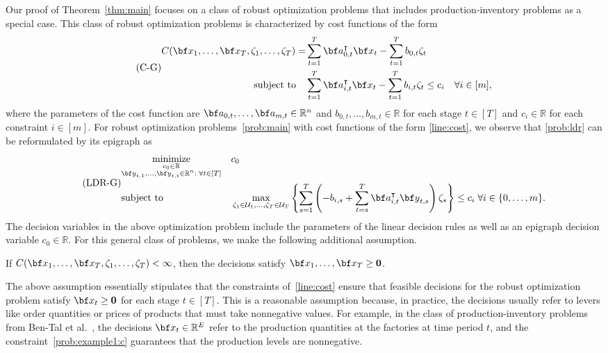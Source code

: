 \documentclass[nonblindrev,mnsc]{informs3} %
\newcommand{\ba}{{\bf a}}
\newcommand{\bx}{{\bf x}}
\newcommand{\by}{{\bf y}}
\def\Real{\mathbb{R}}
\let\R\Real
\newcommand{\bzero}{{\boldsymbol{0}}}
\begin{document}
Our proof of Theorem~\ref{thm:main} focuses on a class of robust optimization   problems that includes production-inventory problems as a special case. This class of robust optimization problems is characterized by cost functions of the form 
\begin{equation} \label{line:cost} \tag{C-G}
\begin{aligned}
C(\bx_1,\ldots,\bx_T,\zeta_1,\ldots,\zeta_T) =&  \sum_{t=1}^T \ba_{0,t}^\intercal \bx_t - \sum_{t=1}^T b_{0,t} \zeta_t  \\
\textnormal{subject to}\quad&  \sum_{t=1}^T \ba_{i,t}^\intercal \bx_t - \sum_{t=1}^T b_{i,t}   \zeta_t  \le c_i   \quad \forall i \in [m],
\end{aligned} 
\end{equation} 
where the parameters of the cost function are  $\ba_{0,t},\ldots,\ba_{m,t} \in \R^{n}$ and $b_{0,t},\ldots,b_{m,t} \in \R$ for each stage $t \in [T]$ and $c_i \in \R$ for each constraint $i \in [m]$. For  robust optimization problems~\eqref{prob:main} with cost functions of the form \eqref{line:cost}, 
we observe that \eqref{prob:ldr} can be reformulated by its epigraph as
\begin{equation}  \tag{LDR-G} \label{prob:ldr_b}
\begin{aligned}
&\underset{\substack{c_0 \in \R\\ \by_{t,1},\ldots,\by_{t,t} \in \R^n:\;  \forall t \in [T]}}{\textnormal{minimize}}&& c_0 \\
&\textnormal{subject to}&& \max_{\zeta_1 \in \mathcal{U}_1, \ldots,\zeta_T \in \mathcal{U}_T}  \left \{ \sum_{s=1}^T\left( - b_{i,s} +  \sum_{t=s}^T \ba_{i,t}^\intercal \by_{t,s} \right)  \zeta_s  \right \}  \le c_i  \;\forall i \in \{0,\ldots,m\}.
\end{aligned}
\end{equation}
The decision variables in the above optimization problem include the parameters of the linear decision rules as well as an epigraph decision variable $c_0 \in \R$. 
For this general class of problems, we make the following additional assumption. 
\begin{assumption}\label{ass:2}  
If $C(\bx_1,\ldots,\bx_T,\zeta_1,\ldots,\zeta_T) < \infty$, then the decisions satisfy $\bx_1,\ldots,\bx_T \ge \bzero$. 
\end{assumption}
The above assumption essentially stipulates that the constraints of~\eqref{line:cost} ensure that feasible decisions for the robust optimization problem satisfy $\bx_t\ge \bzero$ for each stage $t\in[T]$. This is a reasonable assumption because, in practice, the decisions  usually refer to levers like order quantities or prices of products that must take nonnegative values. For example, in the class of  production-inventory problems from Ben-Tal et al.~\cite{ben2004adjustable}, the decisions $\bx_t \in \R^E$ refer to the production quantities at the factories at time period $t$, and the constraint~\eqref{prob:example1:c} guarantees that the production levels are nonnegative.
\end{document}
